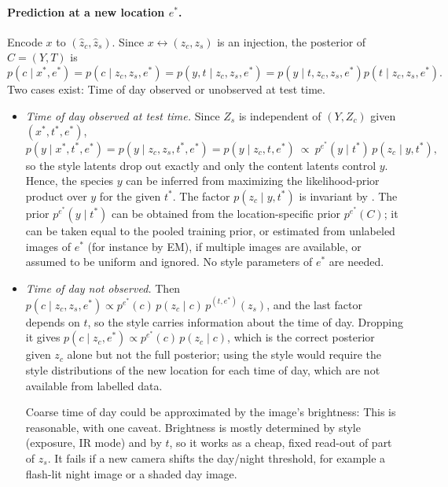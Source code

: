 \paragraph{Prediction at a new location $e^\ast$.}
Encode $x$ to $(\hat z_c,\hat z_s)$. Since $x\leftrightarrow(z_c,z_s)$ is an injection, the 
posterior of $C=(Y,T)$ is
$$
p(c\mid x^\ast,e^\ast) = p(c\mid z_c,z_s,e^\ast) = p(y,t\mid z_c,z_s,e^\ast) =
p(y\mid t,z_c,z_s,e^\ast)p(t\mid z_c,z_s,e^\ast).
$$
\newpage
Two cases exist: Time of day observed or unobserved at test time.
\begin{itemize}
\item \emph{Time of day observed at test time.} Since $Z_s$ is independent of $(Y,Z_c)$
	given $(x^\ast,t^\ast,e^\ast)$,
	\begin{equation}
	p(y\mid x^\ast,t^\ast,e^\ast) =
	p(y\mid z_c,z_s,t^\ast,e^\ast) =
	p(y\mid z_c,t,e^\ast)\ \propto\ p^{e^\ast}(y\mid t^\ast)\,p(z_c\mid y,t^\ast),
	\label{eq:predict}
	\end{equation}
	so the style latents drop out exactly and only the content latents control $y$.
	Hence, the species $y$ can be inferred from maximizing the likelihood-prior product over $y$ for 
	the given $t^\ast$.
	The factor $p(z_c\mid y,t^\ast)$ is invariant by .
	The prior $p^{e^\ast}(y\mid t^\ast)$ can be obtained from the location-specific prior 
	$p^{e^\ast}(C)$;
	it can be taken equal to the pooled training prior, or estimated from unlabeled images of 
	$e^\ast$ (for
	instance by EM), if multiple images are available, or assumed to be uniform and ignored. No 
	style parameters of $e^\ast$ are needed.

\item \emph{Time of day not observed.} Then
	$p(c\mid z_c,z_s,e^\ast)\propto p^{e^\ast}(c)\,p(z_c\mid c)\,p^{(t,e^\ast)}(z_s)$, and the last 
	factor depends on $t$, so the style carries information about the time of day. Dropping it gives
	$p(c\mid z_c,e^\ast)\propto p^{e^\ast}(c)\,p(z_c\mid c)$, which is the correct posterior given 
	$z_c$
	alone but not the full posterior; using the style would require the style distributions of the 
	new  location for each time of day, which are not available from labelled data.

	Coarse time of day could be approximated by the image's brightness:
	This is reasonable, with one caveat. Brightness is mostly determined by style (exposure, IR 
	mode) and by $t$, so it works as a cheap, fixed read-out of part of $z_s$. It fails if a new 
	camera shifts the day/night threshold, for example a flash-lit night image or a shaded day 
	image.


\end{itemize}
